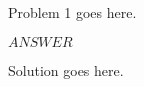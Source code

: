 \documentclass[11pt]{article}
\begin{document}
\begin{problem}
Problem 1 goes here.
\end{problem}
\begin{answer}
$\boxed{ANSWER}$
\end{answer}
\begin{solution}
Solution goes here.
\end{solution}

\begin{problem}

\end{problem}
\end{document}
